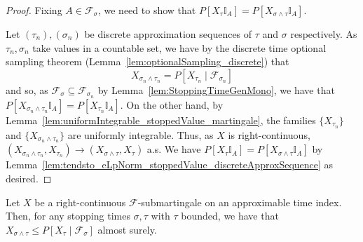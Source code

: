 \begin{proof}
  \leanok
  Fixing $A \in \mathcal{F}_{\sigma}$, we need to show that $P[X_{\tau} \mathbb{I}_A] = P[X_{\sigma \wedge \tau} \mathbb{I}_A]$.

  Let $(\tau_n), (\sigma_n)$ be discrete approximation sequences of $\tau$ and $\sigma$ respectively.
  As $\tau_n, \sigma_n$ take values in a countable set,
  we have by the discrete time optional sampling theorem (Lemma~\ref{lem:optionalSampling_discrete}) that
  $$X_{\sigma_n \wedge \tau_n} = P[X_{\tau_n} \mid \mathcal{F}_{\sigma_n}]$$
  and so, as \(\mathcal{F}_{\sigma} \subseteq \mathcal{F}_{\sigma_n}\) by Lemma~\ref{lem:StoppingTimeGenMono},
  we have that $P[X_{\sigma_n \wedge \tau_n} \mathbb{I}_A] = P[X_{\tau_n} \mathbb{I}_A]$.
  On the other hand, by Lemma~\ref{lem:uniformIntegrable_stoppedValue_martingale}, the families $\{X_{\tau_n}\}$ and $\{X_{\sigma_n \wedge \tau_n}\}$ are uniformly integrable.
  Thus, as $X$ is right-continuous, $(X_{\sigma_n \wedge \tau_n}, X_{\tau_n}) \to (X_{\sigma \wedge \tau}, X_{\tau})$ a.s.
  We have $P[X_{\tau} \mathbb{I}_A] = P[X_{\sigma \wedge \tau} \mathbb{I}_A]$
  by Lemma~\ref{lem:tendsto_eLpNorm_stoppedValue_discreteApproxSequence} as desired.
\end{proof}

\begin{lemma}\label{lem:optionalSamplingSubmartingale}
  \leanok
  Let $X$ be a right-continuous $\mathcal{F}$-submartingale on an approximable time index. Then, for
  any stopping times $\sigma, \tau$ with $\tau$ bounded, we have that
  $X_{\sigma \wedge \tau} \le P[X_{\tau} \mid \mathcal{F}_{\sigma}]$ almost surely.
\end{lemma}

